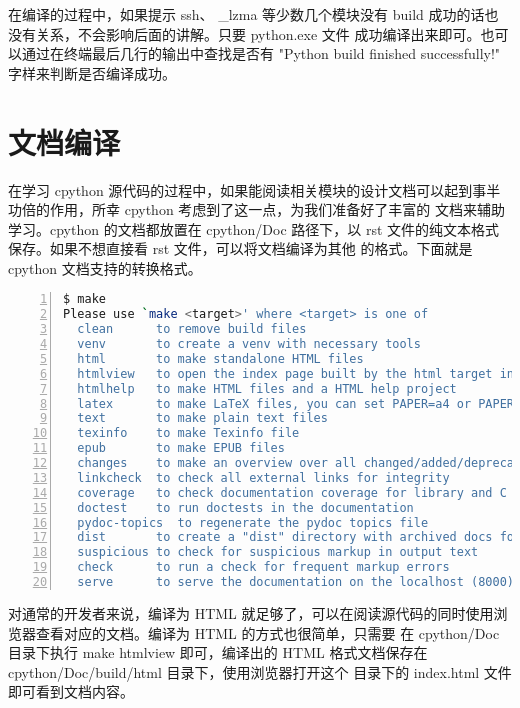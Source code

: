 \begin{definition}[编译过程中的警告] \label{def:int}
在编译的过程中，如果提示 ssh、 \_lzma 等少数几个模块没有 build 成功的话也没有关系，不会影响后面的讲解。只要 python.exe 文件
成功编译出来即可。也可以通过在终端最后几行的输出中查找是否有 "Python build finished successfully!" 字样来判断是否编译成功。
\end{definition}


\section{文档编译}

在学习 cpython 源代码的过程中，如果能阅读相关模块的设计文档可以起到事半功倍的作用，所幸 cpython 考虑到了这一点，为我们准备好了丰富的
文档来辅助学习。cpython 的文档都放置在 cpython/Doc 路径下，以 rst 文件的纯文本格式保存。如果不想直接看 rst 文件，可以将文档编译为其他
的格式。下面就是 cpython 文档支持的转换格式。

\begin{lstlisting}[language=bash, numbers=left, numbersep=1em, numberstyle=\footnotesize , breaklines=true]
$ make
Please use `make <target>' where <target> is one of
  clean      to remove build files
  venv       to create a venv with necessary tools
  html       to make standalone HTML files
  htmlview   to open the index page built by the html target in your browser
  htmlhelp   to make HTML files and a HTML help project
  latex      to make LaTeX files, you can set PAPER=a4 or PAPER=letter
  text       to make plain text files
  texinfo    to make Texinfo file
  epub       to make EPUB files
  changes    to make an overview over all changed/added/deprecated items
  linkcheck  to check all external links for integrity
  coverage   to check documentation coverage for library and C API
  doctest    to run doctests in the documentation
  pydoc-topics  to regenerate the pydoc topics file
  dist       to create a "dist" directory with archived docs for download
  suspicious to check for suspicious markup in output text
  check      to run a check for frequent markup errors
  serve      to serve the documentation on the localhost (8000)
\end{lstlisting}

对通常的开发者来说，编译为 HTML 就足够了，可以在阅读源代码的同时使用浏览器查看对应的文档。编译为 HTML 的方式也很简单，只需要
在 cpython/Doc 目录下执行 make htmlview 即可，编译出的 HTML 格式文档保存在 cpython/Doc/build/html 目录下，使用浏览器打开这个
目录下的 index.html 文件即可看到文档内容。


